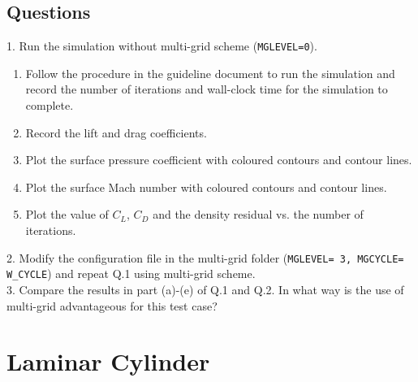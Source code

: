 \section{Questions}
1. Run the simulation without multi-grid scheme (\texttt{MGLEVEL=0}).
\begin{enumerate}[label=(\alph*)]
    \item Follow the procedure in the guideline document to run the simulation and record the number of iterations and wall-clock time for the simulation to complete.
    \item Record the lift and drag coefficients.
    \item Plot the surface pressure coefficient with coloured contours and contour lines.
    \item Plot the surface Mach number with coloured contours and contour lines.
    \item Plot the value of $C_L$, $C_D$ and the density residual vs. the number of iterations.
\end{enumerate}
2. Modify the configuration file in the multi-grid folder (\texttt{MGLEVEL= 3, MGCYCLE= W\_CYCLE}) and repeat Q.1 using multi-grid scheme.\\
3. Compare the results in part (a)-(e) of Q.1 and Q.2. In what way is the use of multi-grid advantageous for this test case?\\
\chapter{Laminar Cylinder}
\label{ch:Laminar Cylinder}
